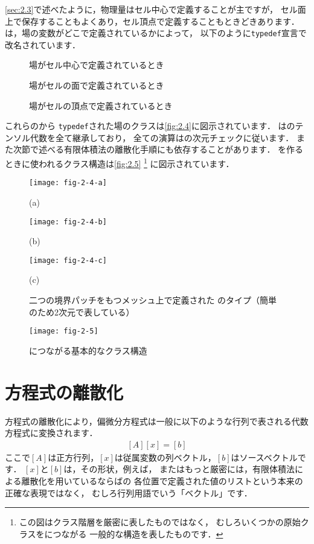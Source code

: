 \autoref{sec:2.3}で述べたように，物理量はセル中心で定義することが主ですが，
セル面上で保存することもよくあり，セル頂点で定義することもときどきあります．
は，場の変数がどこで定義されているかによって，
以下のように\texttt{typedef}宣言で改名されています．
\begin{description}
 \item[] 場がセル中心で定義されているとき
 \item[] 場がセルの面で定義されているとき
 \item[] 場がセルの頂点で定義されているとき
\end{description}

これらのから
\texttt{typedef}された場のクラスは\autoref{fig:2.4}に図示されています．
はのテンソル代数を全て継承しており，
全ての演算はの次元チェックに従います．
また次節で述べる有限体積法の離散化手順にも依存することがあります．
を作るときに使われるクラス構造は\autoref{fig:2.5}%
\footnote{この図はクラス階層を厳密に表したものではなく，
むしろいくつかの原始クラスをにつながる
一般的な構造を表したものです．}%
に図示されています．


\begin{figure}[ht]
 \texttt{[image: fig-2-4-a]}\par
 \medskip
 (a) \par
 \bigskip
 \texttt{[image: fig-2-4-b]}\par
 \medskip
 (b) \par
 \bigskip
 \texttt{[image: fig-2-4-c]}\par
 \medskip
 (c) \par
 \medskip
 \caption{二つの境界パッチをもつメッシュ上で定義された
 のタイプ（簡単のため2次元で表している）}
 \label{fig:2.4}
\end{figure}


\begin{figure}[ht]
 \texttt{[image: fig-2-5]}
 \caption{につながる基本的なクラス構造}
 \label{fig:2.5}
\end{figure}


\section{方程式の離散化}
\label{sec:2.4}
方程式の離散化により，偏微分方程式は一般に以下のような行列で表される代数方程式に変換されます．
\begin{align}
 \label{eq:2.12}
 [A][x] = [b]
\end{align}
ここで$[A]$は正方行列，$[x]$は従属変数の列ベクトル，$[b]$はソースベクトルです．
$[x]$と$[b]$は，その形状，例えば，
またはもっと厳密には，有限体積法による離散化を用いているならばの
各位置で定義された値のリストという本来の正確な表現ではなく，
むしろ行列用語でいう「ベクトル」です．

